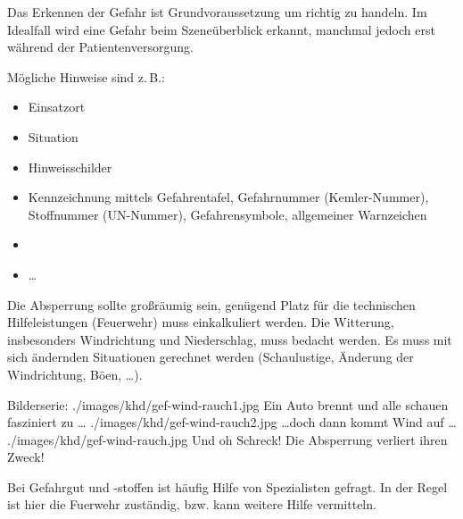 {Das Erkennen der Gefahr ist Grundvoraussetzung um richtig
zu handeln. Im Idealfall wird eine Gefahr beim
Szeneüberblick erkannt, manchmal jedoch erst während der
Patientenversorgung.

Mögliche Hinweise sind z.\,B.:

\begin{itemize}
  \item Einsatzort 
  \item Situation
  \item Hinweisschilder
  \item Kennzeichnung mittels Gefahrentafel, Gefahrnummer
  (Kemler-Nummer), Stoffnummer (UN-Nummer), Gefahrensymbole,
  allgemeiner Warnzeichen
  \item {}
  \item \ldots
\end{itemize}

}{}
{}
{}
{}


{\label{topic:absperrmassnahmen}
Die Absperrung sollte großräumig  sein, genügend Platz für
die technischen Hilfeleistungen (Feuerwehr) muss
einkalkuliert werden. Die Witterung, insbesonders
Windrichtung und Niederschlag, muss bedacht werden. Es muss
mit sich ändernden Situationen gerechnet werden
(Schaulustige, Änderung der Windrichtung, Böen, \ldots).

}
{}
{}
{}
{}

\begin{PictureSeriesWide}{}
{Bilderserie:
 }
{./images/khd/gef-wind-rauch1.jpg}
{Ein Auto brennt und alle schauen
fasziniert zu \ldots }
{./images/khd/gef-wind-rauch2.jpg}
{\ldots doch dann kommt Wind auf \ldots  }
{./images/khd/gef-wind-rauch.jpg}
{Und oh Schreck! Die Absperrung
verliert ihren Zweck! }
{}
{}
\end{PictureSeriesWide}





{Bei Gefahrgut und -stoffen ist häufig Hilfe von
Spezialisten gefragt. In der Regel ist hier die Fuerwehr
zuständig, bzw. kann weitere Hilfe vermitteln.
}
{}
{}
{}
{}




\nocite{Cicero911CommissionReport}



\ChapterEnd
